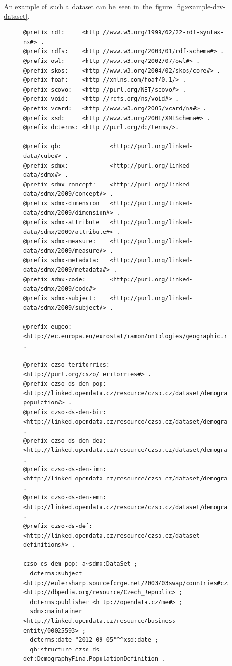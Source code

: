 An example of~such a~dataset can be~seen in~the~figure~\ref{fig:example-dcv-dataset}.

\begin{figure}
\tiny\begin{verbatim}
@prefix rdf:     <http://www.w3.org/1999/02/22-rdf-syntax-ns#> .
@prefix rdfs:    <http://www.w3.org/2000/01/rdf-schema#> .
@prefix owl:     <http://www.w3.org/2002/07/owl#> .
@prefix skos:    <http://www.w3.org/2004/02/skos/core#> .
@prefix foaf:    <http://xmlns.com/foaf/0.1/> .
@prefix scovo:   <http://purl.org/NET/scovo#> .
@prefix void:    <http://rdfs.org/ns/void#> .
@prefix vcard:   <http://www.w3.org/2006/vcard/ns#> .
@prefix xsd:     <http://www.w3.org/2001/XMLSchema#> .
@prefix dcterms: <http://purl.org/dc/terms/>.

@prefix qb:              <http://purl.org/linked-data/cube#> .
@prefix sdmx:            <http://purl.org/linked-data/sdmx#> .
@prefix sdmx-concept:    <http://purl.org/linked-data/sdmx/2009/concept#> .
@prefix sdmx-dimension:  <http://purl.org/linked-data/sdmx/2009/dimension#> .
@prefix sdmx-attribute:  <http://purl.org/linked-data/sdmx/2009/attribute#> .
@prefix sdmx-measure:    <http://purl.org/linked-data/sdmx/2009/measure#> .
@prefix sdmx-metadata:   <http://purl.org/linked-data/sdmx/2009/metadata#> .
@prefix sdmx-code:       <http://purl.org/linked-data/sdmx/2009/code#> .
@prefix sdmx-subject:    <http://purl.org/linked-data/sdmx/2009/subject#> .

@prefix eugeo: <http://ec.europa.eu/eurostat/ramon/ontologies/geographic.rdf#> .

@prefix czso-teritorries:  <http://purl.org/cszo/teritorries#> .
@prefix czso-ds-dem-pop:   <http://linked.opendata.cz/resource/czso.cz/dataset/demography/final-population#> .
@prefix czso-ds-dem-bir:   <http://linked.opendata.cz/resource/czso.cz/dataset/demography/births#> .
@prefix czso-ds-dem-dea:   <http://linked.opendata.cz/resource/czso.cz/dataset/demography/deaths#> .
@prefix czso-ds-dem-imm:   <http://linked.opendata.cz/resource/czso.cz/dataset/demography/immigrants#> .
@prefix czso-ds-dem-emm:   <http://linked.opendata.cz/resource/czso.cz/dataset/demography/emmigrants#> .
@prefix czso-ds-def:       <http://linked.opendata.cz/resource/czso.cz/dataset-definitions#> .

czso-ds-dem-pop: a~sdmx:DataSet ;
  dcterms:subject <http://eulersharp.sourceforge.net/2003/03swap/countries#cz>, <http://dbpedia.org/resource/Czech_Republic> ;
  dcterms:publisher <http://opendata.cz/me#> ;
  sdmx:maintainer <http://linked.opendata.cz/resource/business-entity/00025593> ;
  dcterms:date "2012-09-05"^^xsd:date ;
  qb:structure czso-ds-def:DemographyFinalPopulationDefinition .
  

\end{verbatim}
\end{figure}
